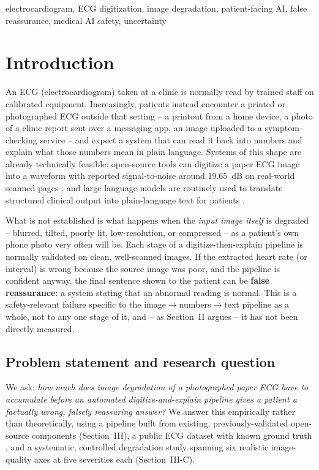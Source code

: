 \documentclass[conference]{IEEEtran}
\begin{document}
\begin{IEEEkeywords}
electrocardiogram, ECG digitization, image degradation, patient-facing AI, false
reassurance, medical AI safety, uncertainty
\end{IEEEkeywords}

\section{Introduction}

An ECG (electrocardiogram) taken at a clinic is normally read by trained staff on
calibrated equipment. Increasingly, patients instead encounter a printed or
photographed ECG outside that setting -- a printout from a home device, a photo of a
clinic report sent over a messaging app, an image uploaded to a symptom-checking
service -- and expect a system that can read it back into numbers and explain what
those numbers mean in plain language. Systems of this shape are already technically
feasible: open-source tools can digitize a paper ECG image into a waveform with
reported signal-to-noise around 19.65~dB on real-world scanned pages \cite{ref5}, and
large language models are routinely used to translate structured clinical output
into plain-language text for patients \cite{ref33,ref34,ref38,ref39,ref40,ref41,ref42,ref43}.

What is not established is what happens when the \emph{input image itself} is
degraded -- blurred, tilted, poorly lit, low-resolution, or compressed -- as a
patient's own phone photo very often will be. Each stage of a digitize-then-explain
pipeline is normally validated on clean, well-scanned images. If the extracted heart
rate (or interval) is wrong because the source image was poor, and the pipeline is
confident anyway, the final sentence shown to the patient can be \textbf{false
reassurance}: a system stating that an abnormal reading is normal. This is a
safety-relevant failure specific to the image$\to$numbers$\to$text pipeline as a
whole, not to any one stage of it, and -- as Section~II argues -- it has not been
directly measured.

\subsection{Problem statement and research question}

We ask: \emph{how much does image degradation of a photographed paper ECG have to
accumulate before an automated digitize-and-explain pipeline gives a patient a
factually wrong, falsely reassuring answer?} We answer this empirically rather than
theoretically, using a pipeline built from existing, previously-validated open-source
components (Section~III), a public ECG dataset with known ground truth \cite{ref45},
and a systematic, controlled degradation study spanning six realistic image-quality
axes at five severities each (Section~III-C).
\end{document}
